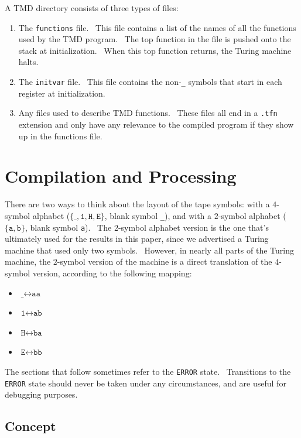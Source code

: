 \documentclass[11pt]{article}
\begin{document}
A TMD directory consists of three types of files:

\begin{enumerate}
\item The \texttt{functions} file. \ This file contains a list of the names of all the functions used by the TMD program. \ The top function in the file is pushed onto the stack at initialization. \ When this top function returns, the Turing machine halts.
\item The \texttt{initvar} file. \ This file contains the non-\texttt{\_} symbols that start in each register at initialization.
\item Any files used to describe TMD functions. \ These files all end in a \texttt{.tfn} extension and only have any relevance to the compiled program if they show up in the functions file.
\end{enumerate}

\section{Compilation and Processing}
\label{COMP}

There are two ways to think about the layout of the tape symbols: with a $4$-symbol alphabet ($\{\texttt{\_}, \texttt{1}, \texttt{H}, \texttt{E}\}$, blank symbol \texttt{\_}), and with a $2$-symbol alphabet ($\{\texttt{a}, \texttt{b}\}$, blank symbol \texttt{a}). \ The $2$-symbol alphabet version is the one that's ultimately used for the results in this paper, since we advertised a Turing machine that used only two symbols. \ However, in nearly all parts of the Turing machine, the $2$-symbol version of the machine is a direct translation of the $4$-symbol version, according to the following mapping:

\begin{itemize}
\item $\texttt{\_} \leftrightarrow \texttt{aa}$
\item $\texttt{1} \leftrightarrow \texttt{ab}$
\item $\texttt{H} \leftrightarrow \texttt{ba}$
\item $\texttt{E} \leftrightarrow \texttt{bb}$
\end{itemize}

The sections that follow sometimes refer to the \texttt{ERROR} state. \ Transitions to the \texttt{ERROR} state should never be taken under any circumstances, and are useful for debugging purposes.

\subsection{Concept} \label{sec:ontape}
\end{document}
